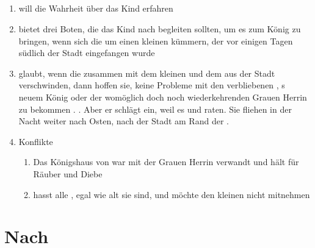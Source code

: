 \documentclass[12pt,a4paper,onecolumn,oneside,ngerman]{book}
\begin{document}
\chapter[Das Geschäft mit \Lobarn]{}
\begin{enumerate}
  \item {\Vester} will die Wahrheit über das Kind erfahren
  \item {\Vester} bietet drei Boten, die das Kind nach {\Rhingell} begleiten sollten, um es zum König zu bringen, wenn sich die {\Schattenlaufer} um einen kleinen {\Bangiri} kümmern, der vor einigen Tagen südlich der Stadt eingefangen wurde
  \item {\Vester} glaubt, wenn die {\Schattenlaufer} zusammen mit dem kleinen {\Bangiri} und dem {\Sturmkind} {\Sena} aus der Stadt verschwinden, dann hoffen sie, keine Probleme mit den verbliebenen {\Bangiri} , {\Rhingell}s neuem König oder der womöglich doch noch wiederkehrenden Grauen Herrin zu bekommen
.\linebreak
. Aber er schlägt ein, weil es {\Naimo} und {\Nox} raten. Sie fliehen in der Nacht weiter nach Osten, nach der Stadt {\Mundis} am Rand der {\Nordmark}.
  \item Konflikte
  \begin{enumerate}
    \item Das Königshaus von {\Rhingell} war mit der Grauen Herrin verwandt und hält {\Schattenlaufer} für Räuber und Diebe
    \item {\Eno} hasst alle {\Bangiri}, egal wie alt sie sind, und möchte den kleinen {\Bangiri} nicht mitnehmen
  \end{enumerate}  
\end{enumerate}

\part{Nach \Rhingell}
\end{document}
